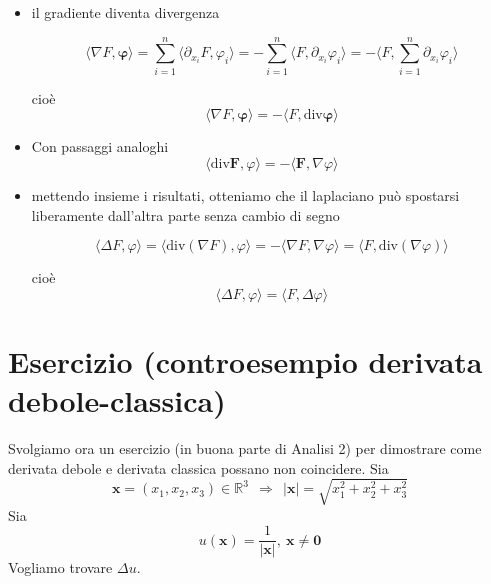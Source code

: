 \documentclass[10pt,a4paper,twoside,openright]{book}
\begin{document}
\begin{itemize}
	\item il gradiente diventa divergenza
	      
	      \begin{equation*}
	      	\langle \nabla F,\bm{\varphi } \rangle =\sum ^{n}_{i=1} \langle \partial _{x_{i}} F,\varphi _{i} \rangle =-\sum ^{n}_{i=1} \langle F,\partial _{x_{i}} \varphi _{i} \rangle =-\langle F ,\sum ^{n}_{i=1} \partial _{x_{i}} \varphi _{i} \rangle 
	      \end{equation*}
	      
	      cioè\begin{equation*}
	      \boxed{\langle \nabla F,\bm{\varphi } \rangle =-\langle F,\mathrm{div}\bm{\varphi } \rangle }
	\end{equation*}
	\item Con passaggi analoghi\begin{equation*}
	      \boxed{\langle \mathrm{div}\mathbf{F} ,\varphi \rangle =-\langle \mathbf{F} ,\nabla \varphi \rangle }
	\end{equation*}
	\item mettendo insieme i risultati, otteniamo che il laplaciano può spostarsi liberamente dall'altra parte senza cambio di segno
	      
	      \begin{equation*}
	      	\langle \Delta F,\varphi \rangle =\langle \mathrm{div}( \nabla F) ,\varphi \rangle =-\langle \nabla F,\nabla \varphi \rangle =\langle F,\mathrm{div}( \nabla \varphi ) \rangle 
	      \end{equation*}
	      
	      cioè\begin{equation*}
	      \boxed{\langle \Delta F ,\varphi \rangle =\langle F,\Delta \varphi \rangle }
	\end{equation*}
\end{itemize}
\section{Esercizio (controesempio derivata debole-classica)}

Svolgiamo ora un esercizio (in buona parte di Analisi 2) per dimostrare come derivata debole e derivata classica possano non coincidere. Sia
\begin{equation*}
	\mathbf{x} =( x_{1} ,x_{2} ,x_{3}) \in \mathbb{R}^{3} \ \ \Rightarrow \ \ | \mathbf{x}| =\sqrt{x^{2}_{1} +x^{2}_{2} +x^{2}_{3}}
\end{equation*}
Sia 
\begin{equation*}
	u(\mathbf{x}) =\frac{1}{| \mathbf{x}| } ,\ \mathbf{x} \neq \mathbf{0}
\end{equation*}
Vogliamo trovare $\displaystyle \Delta u$.
\end{document}
